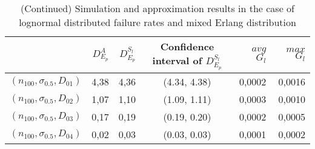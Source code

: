 \documentclass[preprint,12pt]{elsarticle}
\begin{document}
\begin{table}[htbp]
  \centering
  \caption{(Continued) Simulation and approximation results in the case of lognormal distributed failure rates and mixed Erlang distribution}
    \begin{tabular}{rrrcrr}
    \toprule
          & $D_{E_{p}}^{A}$ & $D_{E_{p}}^{S_{l}}$ & Confidence interval of $D_{E_{p}}^{S_{l}}$ & $avg$ $G_{l}$ & $max$ $G_{l}$ \\
    \midrule
 $(n_{100},\sigma_{0.5},D_{01})$& 4,38  & 4,36  &  (4.34, 4.38) & 0,0002 & 0,0016 \\
 $(n_{100},\sigma_{0.5},D_{02})$ & 1,07  & 1,10  &  (1.09, 1.11) & 0,0003 & 0,0010 \\
 $(n_{100},\sigma_{0.5},D_{03})$ & 0,17  & 0,19  &  (0.19, 0.20) & 0,0002 & 0,0005 \\
 $(n_{100},\sigma_{0.5},D_{04})$& 0,02  & 0,03  &  (0.03, 0.03) & 0,0001 & 0,0002 \\
    \bottomrule
    \end{tabular}%
  \label{lognormal2}%
\end{table}%
\end{document}

